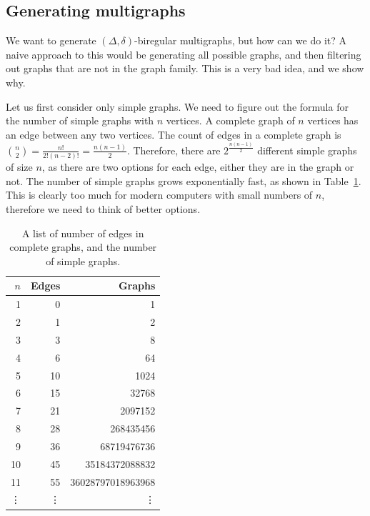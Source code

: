 


\subsection{Generating multigraphs} \label{sec:implementation:generating_multigraphs}
We want to generate $(\Delta, \delta)$-biregular multigraphs, but how can we do it?
A naive approach to this would be generating all possible graphs, and then filtering out graphs that are not in the graph family.
This is a very bad idea, and we show why.

Let us first consider only simple graphs.
We need to figure out the formula for the number of simple graphs with $n$ vertices.
A complete graph of $n$ vertices has an edge between any two vertices.
The count of edges in a complete graph is \(\binom{n}{2} = \frac{n!}{2!(n-2)!} = \frac{n(n-1)}{2}.\)
Therefore, there are \(2^{\frac{n(n-1)}{2}}\) different simple graphs of size $n$, as there are two options for each edge, either they are in the graph or not.
The number of simple graphs grows exponentially fast, as shown in Table~\ref{tbl:graph_count_growth}.
This is clearly too much for modern computers with small numbers of $n$, therefore we need to think of better options.
\begin{table}[H]
  \centering
  \begin{tabular}{r|rr}
    \toprule
    $n$&Edges&Graphs\\
    \midrule
    1 & 0 &1\\
    2 & 1 &2\\
    3 & 3 &8\\
    4 & 6 &64\\
    5 & 10 &1024\\
    6 & 15 &32768\\
    7 & 21 &2097152\\
    8 & 28 &268435456\\
    9 & 36 &68719476736\\
    10 & 45 &35184372088832\\
    11 & 55 &36028797018963968\\
    \vdots & \vdots &\vdots\\
    \bottomrule
  \end{tabular}
  \caption{
    A list of number of edges in complete graphs, and the number of simple graphs.
  }
  \label{tbl:graph_count_growth}
\end{table}

